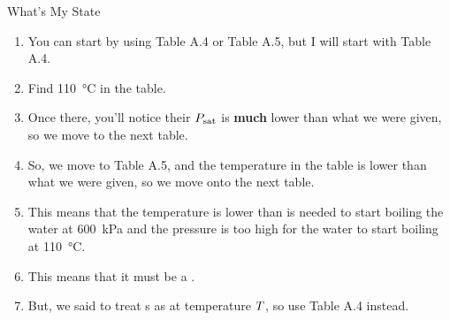 \begin{example}[Problem 4.23]{What's My State}
\begin{enumerate}[noitemsep]
\begin{enumerate}[noitemsep]
    \item You can start by using Table A.4 or Table A.5, but I will start with Table A.4.
    \item Find \SI{110}{\degreeCelsius} in the table.
    \item Once there, you'll notice their $P_{\mathrm{sat}}$ is \textbf{much} lower than what we were given, so we move to the next table.
    \item So, we move to Table A.5, and the temperature in the table is lower than what we were given, so we move onto the next table.
    \item This means that the temperature is lower than is needed to start boiling the water at \SI{600}{\kilo\pascal} and the pressure is too high for the water to start boiling at \SI{110}{\degreeCelsius}.
    \item This means that it must be a .
    \item But, we said to treat s as  at temperature $T$, so use Table A.4 instead.
    \end{enumerate}
  \end{enumerate}
\end{example}

